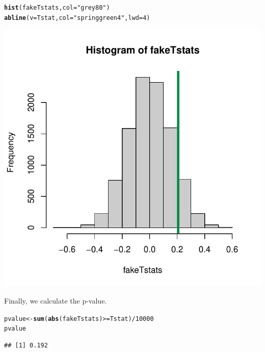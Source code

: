 \documentclass[12 pt]{article}\usepackage[]{graphicx}\usepackage[]{color}
\makeatletter
\def\maxwidth{ %
  \ifdim\Gin@nat@width>\linewidth
    \linewidth
  \else
    \Gin@nat@width
  \fi
}
\newcommand{\hlnum}[1]{\textcolor[rgb]{0.686,0.059,0.569}{#1}}%
\newcommand{\hlstr}[1]{\textcolor[rgb]{0.192,0.494,0.8}{#1}}%
\newcommand{\hlopt}[1]{\textcolor[rgb]{0,0,0}{#1}}%
\newcommand{\hlstd}[1]{\textcolor[rgb]{0.345,0.345,0.345}{#1}}%
\newcommand{\hlkwb}[1]{\textcolor[rgb]{0.69,0.353,0.396}{#1}}%
\newcommand{\hlkwc}[1]{\textcolor[rgb]{0.333,0.667,0.333}{#1}}%
\newcommand{\hlkwd}[1]{\textcolor[rgb]{0.737,0.353,0.396}{\textbf{#1}}}%
\newenvironment{kframe}{%
 \def\at@end@of@kframe{}%
 \ifinner\ifhmode%
  \def\at@end@of@kframe{\end{minipage}}%
  \begin{minipage}{\columnwidth}%
 \fi\fi%
 \def\FrameCommand##1{\hskip\@totalleftmargin \hskip-\fboxsep
 \colorbox{shadecolor}{##1}\hskip-\fboxsep
     \hskip-\linewidth \hskip-\@totalleftmargin \hskip\columnwidth}%
 \MakeFramed {\advance\hsize-\width
   \@totalleftmargin\z@ \linewidth\hsize
   \@setminipage}}%
 {\par\unskip\endMakeFramed%
 \at@end@of@kframe}
\newenvironment{knitrout}{}{} %
\makeatother
\begin{document}
\begin{knitrout}
\color{fgcolor}\begin{kframe}
\begin{alltt}
\hlkwd{hist}\hlstd{(fakeTstats,} \hlkwc{col} \hlstd{=} \hlstr{"grey80"}\hlstd{)}
\hlkwd{abline}\hlstd{(}\hlkwc{v} \hlstd{= Tstat,} \hlkwc{col} \hlstd{=} \hlstr{"springgreen4"}\hlstd{,} \hlkwc{lwd} \hlstd{=} \hlnum{4}\hlstd{)}
\end{alltt}
\end{kframe}

{\centering \includegraphics[width=\maxwidth]{figure/minimal-unnamed-chunk-13-1} 

}



\end{knitrout}

Finally, we calculate the p-value.
\begin{knitrout}
\color{fgcolor}\begin{kframe}
\begin{alltt}
\hlstd{pvalue} \hlkwb{<-} \hlkwd{sum}\hlstd{(}\hlkwd{abs}\hlstd{(fakeTstats)} \hlopt{>=} \hlstd{Tstat)}\hlopt{/}\hlnum{10000}
\hlstd{pvalue}
\end{alltt}
\begin{verbatim}
## [1] 0.192
\end{verbatim}
\end{kframe}
\end{knitrout}
\end{document}

